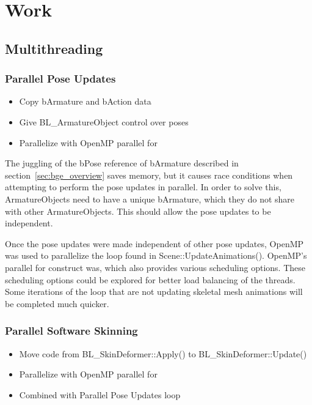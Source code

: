 \section{Work}
\subsection{Multithreading}
\subsubsection{Parallel Pose Updates}
\begin{itemize}
 \item Copy bArmature and bAction data
 \item Give BL\_ArmatureObject control over poses
 \item Parallelize with OpenMP parallel for
\end{itemize}


The juggling of the bPose reference of bArmature described in section~\ref{sec:bge_overview} saves memory, but it causes race conditions when attempting to perform the pose updates in parallel. In order to solve this, ArmatureObjects need to have a unique bArmature, which they do not share with other ArmatureObjects. This should allow the pose updates to be independent.

Once the pose updates were made independent of other pose updates, OpenMP\cite{openmp} was used to parallelize the loop found in Scene::UpdateAnimations(). OpenMP's parallel for construct was, which also provides various scheduling options. These scheduling options could be explored for better load balancing of the threads. Some iterations of the loop that are not updating skeletal mesh animations will be completed much quicker.


\subsubsection{Parallel Software Skinning}
\begin{itemize}
 \item Move code from BL\_SkinDeformer::Apply() to BL\_SkinDeformer::Update()
 \item Parallelize with OpenMP parallel for
 \item Combined with Parallel Pose Updates loop
\end{itemize}

